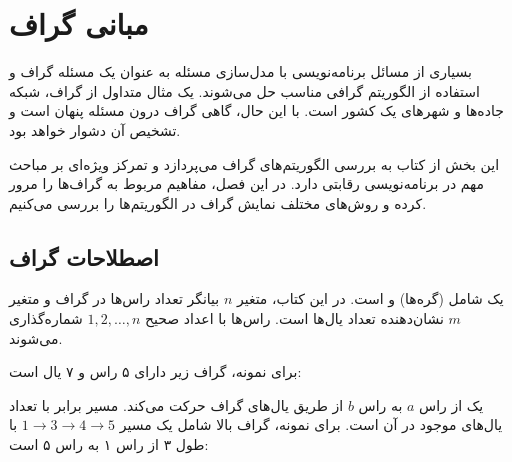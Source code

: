 \chapter{مبانی گراف}

بسیاری از مسائل برنامه‌نویسی با مدل‌سازی مسئله به عنوان یک مسئله گراف و استفاده از الگوریتم گرافی مناسب حل می‌شوند. یک مثال متداول از گراف، شبکه جاده‌ها و شهرهای یک کشور است. با این حال، گاهی گراف درون مسئله پنهان است و تشخیص آن دشوار خواهد بود.

این بخش از کتاب به بررسی الگوریتم‌های گراف می‌پردازد و تمرکز ویژه‌ای بر مباحث مهم در برنامه‌نویسی رقابتی دارد. در این فصل، مفاهیم مربوط به گراف‌ها را مرور کرده و روش‌های مختلف نمایش گراف در الگوریتم‌ها را بررسی می‌کنیم.

\section{اصطلاحات گراف}


یک  شامل  (گره‌ها) و  است. در این کتاب، متغیر $n$ بیانگر تعداد راس‌ها در گراف و متغیر $m$ نشان‌دهنده تعداد یال‌ها است. راس‌ها با اعداد صحیح $1,2,\ldots,n$ شماره‌گذاری می‌شوند.

برای نمونه، گراف زیر دارای ۵ راس و ۷ یال است:

\begin{center}
\end{center}


یک  از راس $a$ به راس $b$ از طریق یال‌های گراف حرکت می‌کند.  مسیر برابر با تعداد یال‌های موجود در آن است. برای نمونه، گراف بالا شامل یک مسیر $1 \rightarrow 3 \rightarrow 4 \rightarrow 5$ با طول ۳ از راس ۱ به راس ۵ است:

